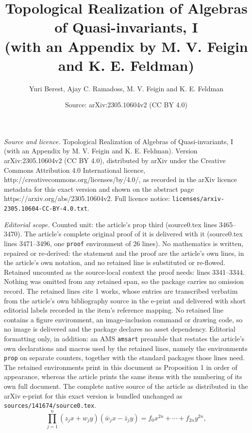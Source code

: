 \documentclass[10pt,a4paper]{amsart}
\title{Topological Realization of Algebras of Quasi-invariants, I\\ (with an Appendix by M. V. Feigin and K. E. Feldman)}
\author{Yuri Berest, Ajay C. Ramadoss, M. V. Feigin and K. E. Feldman}
\date{Source: arXiv:2305.10604v2 (CC BY 4.0)}
\begin{document}
\maketitle

\noindent\emph{Source and licence.} Topological Realization of Algebras of Quasi-invariants, I\\ (with an Appendix by M. V. Feigin and K. E. Feldman). Version arXiv:2305.10604v2 (CC BY 4.0), distributed by arXiv under the Creative Commons Attribution 4.0 International licence, http://creativecommons.org/licenses/by/4.0/, as recorded in the arXiv licence metadata for this exact version and shown on the abstract page https://arxiv.org/abs/2305.10604v2. Full licence notice: \texttt{licenses/arxiv-2305.10604-CC-BY-4.0.txt}.\par\smallskip

\noindent\textit{Editorial scope.} Counted unit: the article's prop third (source0.tex lines 3465--3470). The article's complete original proof of it is delivered with it (source0.tex lines 3471--3496, one \texttt{proof} environment of 26 lines). No mathematics is written, repaired or re-derived: the statement and the proof are the article's own lines, in the article's own notation, and no retained line is substituted or re-flowed.  Retained uncounted as the source-local context the proof needs: lines 3341--3344.  Nothing was omitted from any retained span, so the package carries no omission record.  The retained lines cite 1 works, whose entries are transcribed verbatim from the article's own bibliography source in the e-print and delivered with short editorial labels recorded in the item's reference mapping.  No retained line contains a figure environment, an image-inclusion command or drawing code, so no image is delivered and the package declares no asset dependency.  Editorial formatting only, in addition: an AMS \texttt{amsart} preamble that restates the article's own declarations and macros used by the retained lines, namely the environments \texttt{prop} on separate counters, together with the standard packages those lines need.  The retained environments print in this document as Proposition 1 in order of appearance, whereas the article prints the same items with the numbering of its own full document.  The complete native source of the article as distributed in the arXiv e-print for this exact version is bundled unchanged as \texttt{sources/141674/source0.tex}.
\begin{equation}
    \label{formexpanded}
\prod_{j=1}^n(z_j x +w_j y)(\bar{w}_j x - \bar{z}_jy) = f_0x^{2n} + \cdots + f_{2n}y^{2n},
\end{equation}
\end{document}
